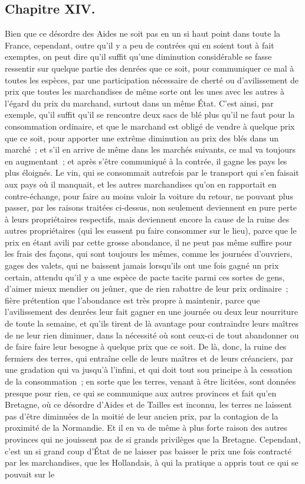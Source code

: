 \documentclass[french,twoside]{book} %
\begin{document}
\subsection[{Chapitre XIV.}]{Chapitre XIV.}
\noindent Bien que ce désordre des Aides ne soit pas en un si haut point dans toute la France, cependant, outre qu’il y a peu de contrées qui en soient tout à fait exemptes, on peut dire qu’il suffit qu’une diminution considérable se fasse ressentir sur quelque partie des denrées que ce soit, pour communiquer ce mal à toutes les espèces, par une participation nécessaire de cherté ou d’avilissement de prix que toutes les marchandises de même sorte ont les unes avec les autres à l’égard du prix du marchand, surtout dans un même État. C’est ainsi, par exemple, qu’il suffit qu’il se rencontre deux sacs de blé plus qu’il ne faut pour la consommation ordinaire, et que le marchand est obligé de vendre à quelque prix que ce soit, pour apporter une extrême diminution au prix des blés dans un marché ; et s’il en arrive de même dans les marchés suivants, ce mal va toujours en augmentant ; et après s’être communiqué à la contrée, il gagne les pays les plus éloignés. Le vin, qui se consommait autrefois par le transport qui s’en faisait aux pays où il manquait, et les autres marchandises qu’on en rapportait en contre-échange, pour faire au moins valoir la voiture du retour, ne pouvant plus passer, par les raisons traitées ci-dessus, non seulement deviennent en pure perte à leurs propriétaires respectifs, mais deviennent encore la cause de la ruine des autres propriétaires (qui les eussent pu faire consommer sur le lieu), parce que le prix en étant avili par cette grosse abondance, il ne peut pas même suffire pour les frais des façons, qui sont toujours les mêmes, comme les journées d’ouvriers, gages des valets, qui ne baissent jamais lorsqu’ils ont une fois gagné un prix certain, attendu qu’il y a une espèce de pacte tacite parmi ces sortes de gens, d’aimer mieux mendier ou jeûner, que de rien rabattre de leur prix ordinaire ; fière prétention que l’abondance est très propre à maintenir, parce que l’avilissement des denrées leur fait gagner en une journée ou deux leur nourriture de toute la semaine, et qu’ils tirent de là avantage pour contraindre leurs maîtres de ne leur rien diminuer, dans la nécessité où sont ceux-ci de tout abandonner ou de faire faire leur besogne à quelque prix que ce soit. De là, donc, la ruine des fermiers des terres, qui entraîne celle de leurs maîtres et de leurs créanciers, par une gradation qui va jusqu’à l’infini, et qui doit tout sou principe à la cessation de la consommation ; en sorte que les terres, venant à être licitées, sont données presque pour rien, ce qui se communique aux autres provinces et fait qu’en Bretagne, où ce désordre d’Aides et de Tailles est inconnu, les terres ne laissent pas d’être diminuées de la moitié de leur ancien prix, par la contagion de la proximité de la Normandie. Et il en va de même à plus forte raison des autres provinces qui ne jouissent pas de si grands privilèges que la Bretagne. Cependant, c’est un si grand coup d’État de ne laisser pas baisser le prix une fois contracté par les marchandises, que les Hollandais, à qui la pratique a appris tout ce qui se pouvait sur le 
\end{document}
